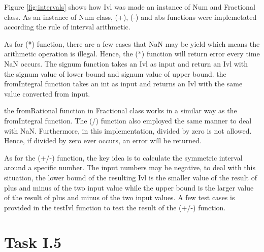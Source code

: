\documentclass{article}
\begin{document}
\begin{normalsize}
  Figure \ref{fig:intervals} shows how Ivl was made an instance of Num and
  Fractional class. As an instance of Num class, (+), (-) and abs functions were
  implemetated according the rule of interval arithmetic.

  As for (*) function, there are a few cases that NaN may be yield which means
  the arithmetic operation is illegal. Hence, the (*) function will return error
  every time NaN occurs. The signum function takes an Ivl as input and return an
  Ivl with the signum value of lower bound and signum value of upper bound. the
  fromIntegral function takes an int as input and returns an Ivl with the same
  value converted from input.

  the fromRational function in Fractional class works in a similar way as the
  fromIntegral function. The (/) function also employed the same manner to deal
  with NaN. Furthermore, in this implementation, divided by zero is not allowed.
  Hence, if divided by zero ever occurs, an error will be returned.

  As for the (+/-) function, the key idea is to calculate the symmetric interval
  around a specific number. The input numbers may be negative, to deal with this
  situation, the lower bound of the resulting Ivl is the smaller value of the
  result of plus and minus of the two input value while the upper bound is the
  larger value of the result of plus and minus of the two input values. A few
  test cases is provided in the testIvl function to test the result of the (+/-)
  function. 

  \section{Task I.5}

  \begin{figure}[H]


\end{figure}
\end{normalsize}
\end{document}
